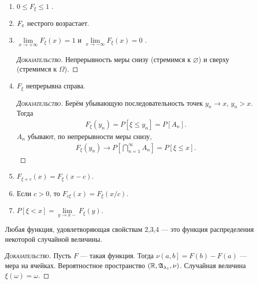 \begin{prop*}\
 \begin{enumerate}
  \item $0 \leqslant F_{\xi} \leqslant 1$ .
  \item $F_{\varepsilon}$  нестрого возрастает.
  \item $\lim\limits_{x \to +\infty} F_{\xi}(x) = 1$  и $\lim\limits_{x \to -\infty} F_{\xi}(x) = 0$ .
   \begin{proof}[\normalfont\textsc{Доказательство}]
    Непрерывность меры снизу (стремимся к $\varnothing$) и сверху (стремимся к $\Omega$).
   \end{proof}
  \item $F_{\xi}$  непрерывна справа.
   \begin{proof}[\normalfont\textsc{Доказательство}]
     Берём убывающую последовательность точек $y_n \to x$, $y_n > x$. Тогда
     \begin{align*}
     F_{\xi}(y_n) = P[\xi \leqslant y_n] = P[A_n]
    .\end{align*} $A_n$ убывают, по непрерывности меры снизу,
     \begin{align*}
      F_{\xi}(y_n) \to P \left[ \bigcap_{n=1}^{\infty} A_n \right] = P[\xi \leqslant x].
    \end{align*} 
   \end{proof}
  \item $F_{\xi + c}(x) = F_{\xi}(x - c)$.
  \item Если $c > 0$, то $F_{c\xi}(x) = F_{\xi}(x / c)$.
  \item $P[\xi < x] = \lim\limits_{y \to x-} F_{\xi}(y)$.
 \end{enumerate}
\end{prop*}
\begin{remrk}
 Любая функция, удовлетворяющая свойствам 2,3,4 --- это функция распределения некоторой случайной величины.
\end{remrk}
\begin{proof}[\normalfont\textsc{Доказательство}]
 Пусть $F$ --- такая функция. Тогда $\nu \left(a, b\right] = F(b) - F(a) $ --- мера на ячейках. Вероятностное пространство $(\mathbb{R}, \mathfrak{A}_{\lambda_1}, \nu)$. Случайная величина $\xi(\omega) = \omega$.
\end{proof}

